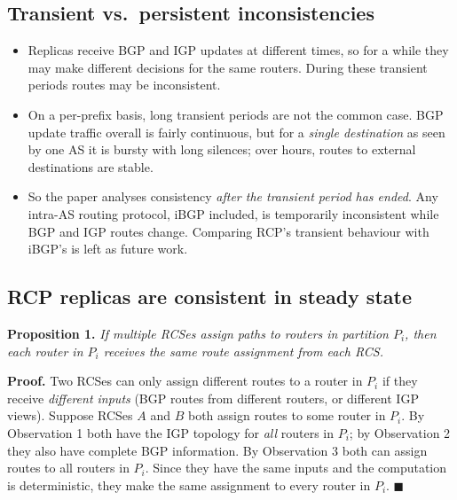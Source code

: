 \subsection{Transient vs.\ persistent inconsistencies}
\begin{itemize}
\item Replicas receive BGP and IGP updates at different times, so for a while they may make different decisions for the same routers. During these transient periods routes may be inconsistent.
\item On a per-prefix basis, long transient periods are not the common case. BGP update traffic overall is fairly continuous, but for a \emph{single destination} as seen by one AS it is bursty with long silences; over hours, routes to external destinations are stable.
\item So the paper analyses consistency \emph{after the transient period has ended}. Any intra-AS routing protocol, iBGP included, is temporarily inconsistent while BGP and IGP routes change. Comparing RCP's transient behaviour with iBGP's is left as future work.
\end{itemize}

\subsection{RCP replicas are consistent in steady state}
\textbf{Proposition 1.} \emph{If multiple RCSes assign paths to routers in partition $P_i$, then each router in $P_i$ receives the same route assignment from each RCS.}

\textbf{Proof.} Two RCSes can only assign different routes to a router in $P_i$ if they receive \emph{different inputs} (BGP routes from different routers, or different IGP views). Suppose RCSes $A$ and $B$ both assign routes to some router in $P_i$. By Observation 1 both have the IGP topology for \emph{all} routers in $P_i$; by Observation 2 they also have complete BGP information. By Observation 3 both can assign routes to all routers in $P_i$. Since they have the same inputs and the computation is deterministic, they make the same assignment to every router in $P_i$. \hfill$\blacksquare$

